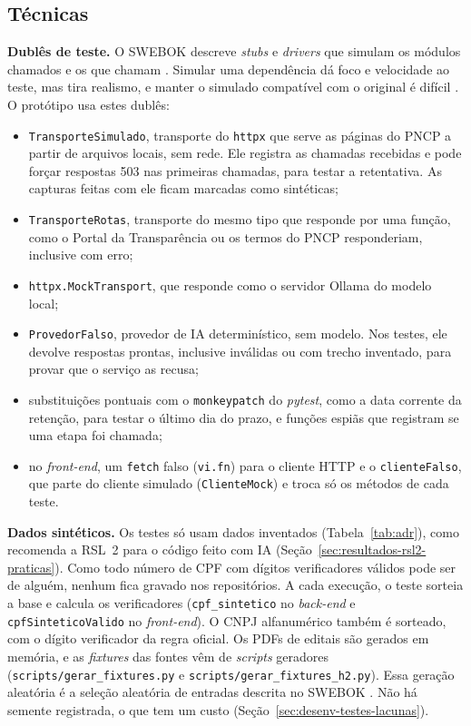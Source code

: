 \subsection{Técnicas}
\label{sec:desenv-testes-tecnicas}

\textbf{Dublês de teste.} O SWEBOK descreve \textit{stubs} e
\textit{drivers} que simulam os módulos chamados e os que chamam
\cite[cap.~5, seç.~8.2]{swebok4}. Simular uma dependência dá foco e
velocidade ao teste, mas tira realismo, e manter o simulado compatível com o
original é difícil \cite{spadini2017mock}. O protótipo usa estes dublês:
\begin{itemize}
	\item \texttt{TransporteSimulado}, transporte do \texttt{httpx} que serve
	as páginas do PNCP a partir de arquivos locais, sem rede. Ele registra as
	chamadas recebidas e pode forçar respostas 503 nas primeiras chamadas,
	para testar a retentativa. As capturas feitas com ele ficam marcadas como
	sintéticas;
	\item \texttt{TransporteRotas}, transporte do mesmo tipo que responde por
	uma função, como o Portal da Transparência ou os termos do PNCP
	responderiam, inclusive com erro;
	\item \texttt{httpx.MockTransport}, que responde como o servidor Ollama
	do modelo local;
	\item \texttt{ProvedorFalso}, provedor de IA determinístico, sem modelo.
	Nos testes, ele devolve respostas prontas, inclusive inválidas ou com
	trecho inventado, para provar que o serviço as recusa;
	\item substituições pontuais com o \texttt{monkeypatch} do \textit{pytest},
	como a data corrente da retenção, para testar o último dia do prazo, e
	funções espiãs que registram se uma etapa foi chamada;
	\item no \textit{front-end}, um \texttt{fetch} falso (\texttt{vi.fn}) para o
	cliente HTTP e o \texttt{clienteFalso}, que parte do cliente simulado
	(\texttt{ClienteMock}) e troca só os métodos de cada teste.
\end{itemize}

\textbf{Dados sintéticos.} Os testes só usam dados inventados
(Tabela~\ref{tab:adr}), como recomenda a RSL~2 para o código feito com IA
(Seção~\ref{sec:resultados-rsl2-praticas}). Como todo número de CPF com
dígitos verificadores válidos pode ser de alguém, nenhum fica gravado nos
repositórios. A cada execução, o teste sorteia a base e calcula os
verificadores (\texttt{cpf\_sintetico} no \textit{back-end} e
\texttt{cpfSinteticoValido} no \textit{front-end}). O CNPJ alfanumérico
também é sorteado, com o dígito verificador da regra oficial. Os PDFs de
editais são gerados em memória, e as \textit{fixtures} das fontes vêm de
\textit{scripts} geradores (\texttt{scripts/gerar\_fixtures.py} e
\texttt{scripts/gerar\_fixtures\_h2.py}). Essa geração aleatória é a seleção
aleatória de entradas descrita no SWEBOK \cite[cap.~5, seç.~3.7.2]{swebok4}.
Não há semente registrada, o que tem um custo (Seção~\ref{sec:desenv-testes-lacunas}).

